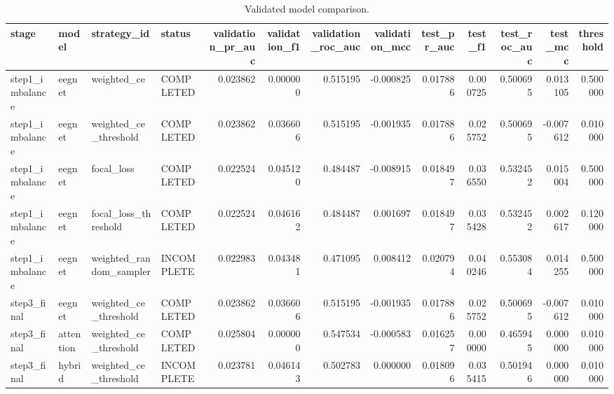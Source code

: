 \begin{table}
\caption{Validated model comparison.}
\label{tab:model_comparison_table}
\begin{tabular}{llllrrrrrrrrr}
\toprule
stage & model & strategy\_id & status & validation\_pr\_auc & validation\_f1 & validation\_roc\_auc & validation\_mcc & test\_pr\_auc & test\_f1 & test\_roc\_auc & test\_mcc & threshold \\
\midrule
step1\_imbalance & eegnet & weighted\_ce & COMPLETED & 0.023862 & 0.000000 & 0.515195 & -0.000825 & 0.017886 & 0.000725 & 0.500695 & 0.013105 & 0.500000 \\
step1\_imbalance & eegnet & weighted\_ce\_threshold & COMPLETED & 0.023862 & 0.036606 & 0.515195 & -0.001935 & 0.017886 & 0.025752 & 0.500695 & -0.007612 & 0.010000 \\
step1\_imbalance & eegnet & focal\_loss & COMPLETED & 0.022524 & 0.045120 & 0.484487 & -0.008915 & 0.018497 & 0.036550 & 0.532452 & 0.015004 & 0.500000 \\
step1\_imbalance & eegnet & focal\_loss\_threshold & COMPLETED & 0.022524 & 0.046162 & 0.484487 & 0.001697 & 0.018497 & 0.035428 & 0.532452 & 0.002617 & 0.120000 \\
step1\_imbalance & eegnet & weighted\_random\_sampler & INCOMPLETE & 0.022983 & 0.043481 & 0.471095 & 0.008412 & 0.020794 & 0.040246 & 0.553084 & 0.014255 & 0.500000 \\
step3\_final & eegnet & weighted\_ce\_threshold & COMPLETED & 0.023862 & 0.036606 & 0.515195 & -0.001935 & 0.017886 & 0.025752 & 0.500695 & -0.007612 & 0.010000 \\
step3\_final & attention & weighted\_ce\_threshold & COMPLETED & 0.025804 & 0.000000 & 0.547534 & -0.000583 & 0.016257 & 0.000000 & 0.465945 & 0.000000 & 0.010000 \\
step3\_final & hybrid & weighted\_ce\_threshold & INCOMPLETE & 0.023781 & 0.046143 & 0.502783 & 0.000000 & 0.018096 & 0.035415 & 0.501946 & 0.000000 & 0.010000 \\
\bottomrule
\end{tabular}
\end{table}
